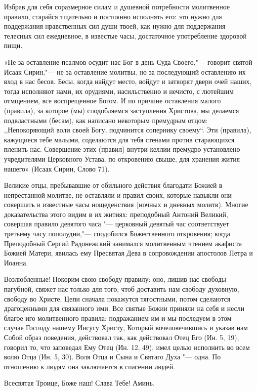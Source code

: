{{{{Избрав для себя соразмерное силам и душевной потребности молитвенное правило, старайся тщательно и постоянно исполнять его: это нужно для поддержания нравственных сил души твоей, как нужно для поддержания телесных сил ежедневное, в известые часы, достаточное употребление здоровой пищи.

«Не за оставление псалмов осудит нас Бог в день Суда Своего,"--- говорит святой Исаак Сирин,"--- не за оставление молитвы, но за последующий оставлению их вход в нас бесов. Бесы, когда найдут место, войдут и затворят двери очей наших, тогда исполняют нами, их орудиями, насильственно и нечисто, с лютейшим отмщением, все воспрещенное Богом. И по причине оставления малого (правила), за которое (мы) сподобляемся заступления Христова, мы делаемся подвластными (бесам), как написано некоторым премудрым отцом: ,,Непокоряющий воли своей Богу, подчинится сопернику своему``. Эти (правила), кажущиеся тебе малыми, соделаются для тебя стенами против старающихся пленить нас. Совершение этих (правил) внутри келлии премудро установлено учредителями Церковного Устава, по откровению свыше, для хранения жития нашего» (Исаак Сирин, Слово 71).

Великие отцы, пребывавшие от обильного действия благодати Божией в непрестанной молитве, не оставляли и правил своих, которые навыкли они совершать в известные часы нощеденствия (ночных и дневных молитв). Многие доказательства этого видим в их житиях: преподобный Антоний Великий, совершая правило девятого часа "--- церковный девятый час соответствует третьему часу пополудни,"--- сподобился Божественного откровения; когда Преподобный Сергий Радонежский занимался молитвенным чтением акафиста Божией Матери, явилась ему Пресвятая Дева в сопровождении апостолов Петра и Иоанна.

Возлюбленные! Покорим свою свободу правилу: оно, лишив нас свободы пагубной, свяжет нас только для того, чтоб доставить нам свободу духовную, свободу во Христе. Цепи сначала покажутся тягостными, потом сделаются драгоценными для связанного ими. Все святые Божии приняли на себя и несли благое иго молитвенного правила; подражанием им и мы последуем в этом случае Господу нашему Иисусу Христу, Который вочеловечившись и указав нам Собой образ поведения, действовал так, как действовал Отец Его (Ин. 5, 19), говорил то, что заповедал Ему Отец (Ин. 12, 49), имел целью исполнить во всем волю Отца (Ин. 5, 30). Воля Отца и Сына и Святаго Духа "--- одна. По отношению к людям она заключается в спасении людей.

Всесвятая Троице, Боже наш! Слава Тебе! Аминь.

}}}}

